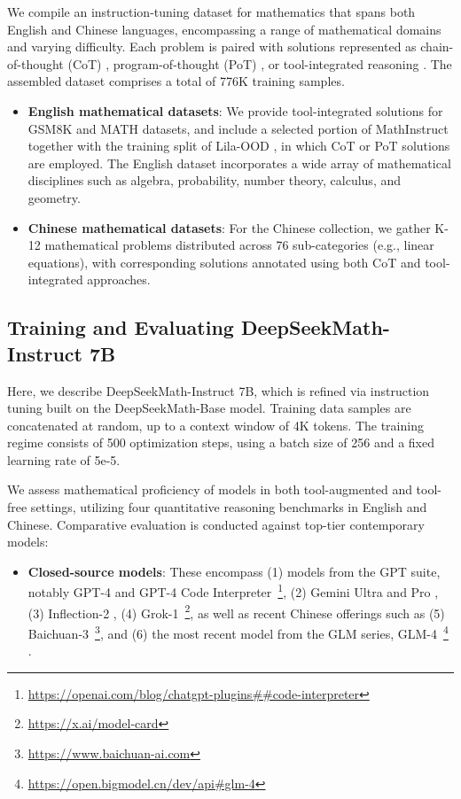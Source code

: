 We compile an instruction-tuning dataset for mathematics that spans both English and Chinese languages, encompassing a range of mathematical domains and varying difficulty. Each problem is paired with solutions represented as chain-of-thought (CoT) \citep{cot}, program-of-thought (PoT) \citep{pot,pal}, or tool-integrated reasoning \citep{tora}. The assembled dataset comprises a total of 776K training samples.

\begin{itemize}[topsep=0pt]
    \item \textbf{English mathematical datasets}: We provide tool-integrated solutions for GSM8K and MATH datasets, and include a selected portion of MathInstruct \citep{MathInstruct} together with the training split of Lila-OOD \citep{lila}, in which CoT or PoT solutions are employed. The English dataset incorporates a wide array of mathematical disciplines such as algebra, probability, number theory, calculus, and geometry.
    \item \textbf{Chinese mathematical datasets}: For the Chinese collection, we gather K-12 mathematical problems distributed across 76 sub-categories (e.g., linear equations), with corresponding solutions annotated using both CoT and tool-integrated approaches.
\end{itemize}

\subsection{Training and Evaluating DeepSeekMath-Instruct 7B}

Here, we describe DeepSeekMath-Instruct 7B, which is refined via instruction tuning built on the DeepSeekMath-Base model. Training data samples are concatenated at random, up to a context window of 4K tokens. The training regime consists of 500 optimization steps, using a batch size of 256 and a fixed learning rate of 5e-5.

We assess mathematical proficiency of models in both tool-augmented and tool-free settings, utilizing four quantitative reasoning benchmarks in English and Chinese. Comparative evaluation is conducted against top-tier contemporary models:

\begin{itemize}[topsep=0pt]
    \item \textbf{Closed-source models}: These encompass (1) models from the GPT suite, notably GPT-4 \citep{gpt4} and GPT-4 Code Interpreter~\footnote{\url{https://openai.com/blog/chatgpt-plugins\#\#code-interpreter}}, (2) Gemini Ultra and Pro \citep{gemini}, (3) Inflection-2 \citep{inflection-2}, (4) Grok-1~\footnote{\url{https://x.ai/model-card}}, as well as recent Chinese offerings such as (5) Baichuan-3~\footnote{\url{https://www.baichuan-ai.com}}, and (6) the most recent model from the GLM series, GLM-4~\footnote{\url{https://open.bigmodel.cn/dev/api\#glm-4}} \citep{glm}.
\end{itemize}


